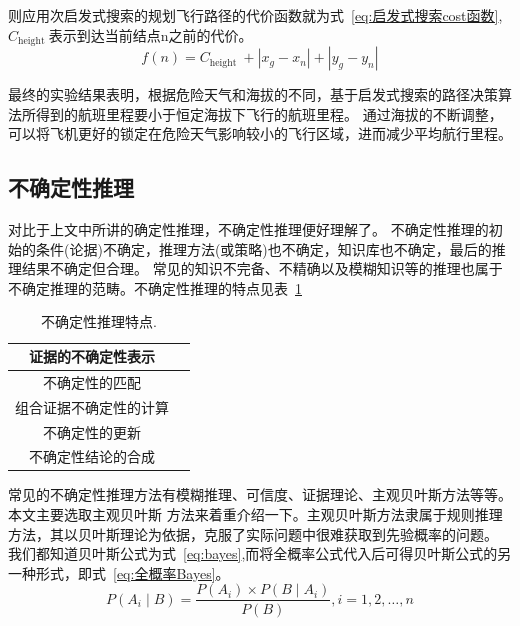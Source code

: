 \documentclass[12pt,a4paper,UTF8]{ctexart}
\begin{document}
则应用次启发式搜索的规划飞行路径的代价函数就为式~\ref{eq:启发式搜索cost函数},$ C_{\text {height }} $表示到达当前结点n之前的代价。
\begin{equation}
    f(n)=C_{\text {height }}+\left|x_g-x_n\right|+\left|y_g-y_n\right|
    \label{eq:启发式搜索cost函数}
\end{equation}

最终的实验结果表明，根据危险天气和海拔的不同，基于启发式搜索的路径决策算法所得到的航班里程要小于恒定海拔下飞行的航班里程。
通过海拔的不断调整，可以将飞机更好的锁定在危险天气影响较小的飞行区域，进而减少平均航行里程\cite{hePathPlanningMethod2019}。

\subsection{不确定性推理}
对比于上文中所讲的确定性推理，不确定性推理便好理解了。
不确定性推理的初始的条件(论据)不确定，推理方法(或策略)也不确定，知识库也不确定，最后的推理结果不确定但合理。
常见的知识不完备、不精确以及模糊知识等的推理也属于不确定推理的范畴。不确定性推理的特点见表~\ref{table:bqdx特点}
\begin{table}[htb]
    \centering
    \caption{不确定性推理特点.}
    \label{table:bqdx特点}
    \begin{tabular}{@{}cc@{}}
    \toprule
    证据的不确定性表示                       \\ \hline
    不确定性的匹配                         \\ \hline
    \multicolumn{1}{l}{组合证据不确定性的计算} \\ \hline
    不确定性的更新                         \\ \hline
    不确定性结论的合成                       \\ \hline
    \toprule
    \end{tabular}
\end{table}

常见的不确定性推理方法有模糊推理、可信度、证据理论、主观贝叶斯方法等等。本文主要选取主观贝叶斯
方法来着重介绍一下。主观贝叶斯方法隶属于规则推理方法，其以贝叶斯理论为依据，克服了实际问题中很难获取到先验概率的问题。\cite{gonenComparingObjectiveSubjective2019}\cite{uzunogluAdaptiveBayesianApproach2020a}
我们都知道贝叶斯公式为式~\ref{eq:bayes},而将全概率公式代入后可得贝叶斯公式的另一种形式，即式~\ref{eq:全概率Bayes}。
\begin{equation}
    P\left(A_i \mid B\right)=\frac{P\left(A_i\right) \times P\left(B \mid A_i\right)}{P(B)}, i=1,2, \ldots, n
    \label{eq:bayes}
\end{equation}
\end{document}
